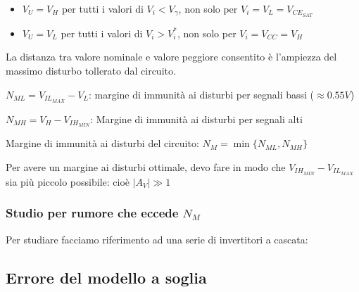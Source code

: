 \documentclass{article}
\begin{document}
\begin{itemize}
    \item $V_U = V_H$ per tutti i valori di $V_i < V_\gamma$, non solo per $V_i = V_L = V_{CE_{SAT}}$
    \item $V_U = V_L$ per tutti i valori di $V_i > V_i^*$, non solo per $V_i = V_{CC} = V_H$
\end{itemize}

La distanza tra valore nominale e valore peggiore consentito è l'ampiezza del massimo disturbo tollerato dal circuito.

$ N_{ML} = V_{IL_{MAX}} - V_L $: margine di immunità ai disturbi per segnali bassi ($\approx 0.55V$)

$N_{MH} = V_H - V_{IH_{MIN}}$: Margine di immunità ai disturbi per segnali alti

Margine di immunità ai disturbi del circuito: $N_M = \min \{N_{ML}, N_{MH} \}$

Per avere un margine ai disturbi ottimale, devo fare in modo che $V_{IH_{MIN}} - V_{IL_{MAX}}$ sia più piccolo possibile: cioè $|A_V| \gg 1$


\subsubsection*{Studio per rumore che eccede $N_M$}
Per studiare facciamo riferimento ad una serie di invertitori a cascata:

\begin{center}
\end{center}


\subsection{Errore del modello a soglia}
\end{document}
